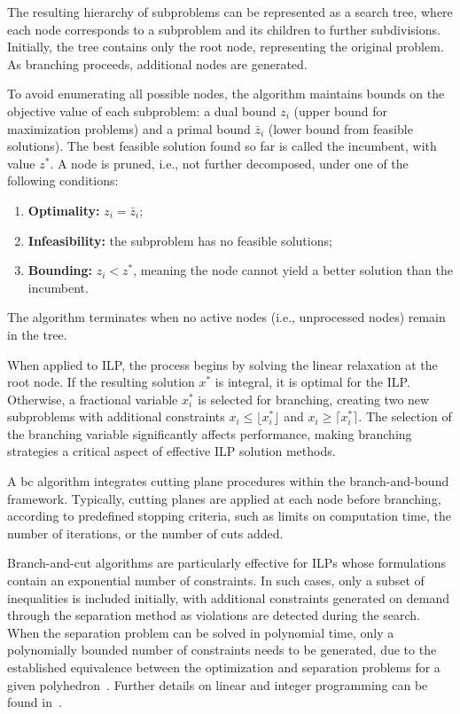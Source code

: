 The resulting hierarchy of subproblems can be represented as a search tree, where each node corresponds to a subproblem and its children to further subdivisions. Initially, the tree contains only the root node, representing the original problem. As branching proceeds, additional nodes are generated.

To avoid enumerating all possible nodes, the algorithm maintains bounds on the objective value of each subproblem: a dual bound $z_i$ (upper bound for maximization problems) and a primal bound $\bar{z}_i$ (lower bound from feasible solutions). The best feasible solution found so far is called the incumbent, with value $z^*$. A node is pruned, i.e., not further decomposed, under one of the following conditions:
\begin{enumerate}
	\item \textbf{Optimality:} $z_i = \bar{z}_i$;
	\item \textbf{Infeasibility:} the subproblem has no feasible solutions;
	\item \textbf{Bounding:} $z_i < z^*$, meaning the node cannot yield a better solution than the incumbent.
\end{enumerate}
The algorithm terminates when no active nodes (i.e., unprocessed nodes) remain in the tree.

When applied to ILP, the process begins by solving the linear relaxation at the root node. If the resulting solution $x^*$ is integral, it is optimal for the ILP. Otherwise, a fractional variable $x_i^*$ is selected for branching, creating two new subproblems with additional constraints $x_i \le \lfloor x_i^* \rfloor$ and $x_i \ge \lceil x_i^* \rceil$. The selection of the branching variable significantly affects performance, making branching strategies a critical aspect of effective ILP solution methods.

A \gls{bc} algorithm integrates cutting plane procedures within the branch-and-bound framework. Typically, cutting planes are applied at each node before branching, according to predefined stopping criteria, such as limits on computation time, the number of iterations, or the number of cuts added.

Branch-and-cut algorithms are particularly effective for ILPs whose formulations contain an exponential number of constraints. In such cases, only a subset of inequalities is included initially, with additional constraints generated on demand through the separation method as violations are detected during the search. When the separation problem can be solved in polynomial time, only a polynomially bounded number of constraints needs to be generated, due to the established equivalence between the optimization and separation problems for a given polyhedron~\cite{groetschel1988geometric}. Further details on linear and integer programming can be found in~\cite{bertsimas1997introduction, wolsey1998integer}.

